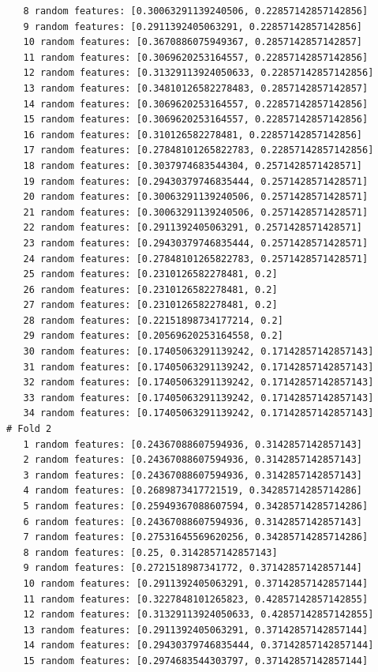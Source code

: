 \documentclass[12pt]{amsart}
\begin{document}
\begin{verbatim}
   8 random features: [0.30063291139240506, 0.22857142857142856]
   9 random features: [0.2911392405063291, 0.22857142857142856]
   10 random features: [0.3670886075949367, 0.2857142857142857]
   11 random features: [0.3069620253164557, 0.22857142857142856]
   12 random features: [0.31329113924050633, 0.22857142857142856]
   13 random features: [0.34810126582278483, 0.2857142857142857]
   14 random features: [0.3069620253164557, 0.22857142857142856]
   15 random features: [0.3069620253164557, 0.22857142857142856]
   16 random features: [0.310126582278481, 0.22857142857142856]
   17 random features: [0.27848101265822783, 0.22857142857142856]
   18 random features: [0.3037974683544304, 0.2571428571428571]
   19 random features: [0.29430379746835444, 0.2571428571428571]
   20 random features: [0.30063291139240506, 0.2571428571428571]
   21 random features: [0.30063291139240506, 0.2571428571428571]
   22 random features: [0.2911392405063291, 0.2571428571428571]
   23 random features: [0.29430379746835444, 0.2571428571428571]
   24 random features: [0.27848101265822783, 0.2571428571428571]
   25 random features: [0.2310126582278481, 0.2]
   26 random features: [0.2310126582278481, 0.2]
   27 random features: [0.2310126582278481, 0.2]
   28 random features: [0.22151898734177214, 0.2]
   29 random features: [0.20569620253164558, 0.2]
   30 random features: [0.17405063291139242, 0.17142857142857143]
   31 random features: [0.17405063291139242, 0.17142857142857143]
   32 random features: [0.17405063291139242, 0.17142857142857143]
   33 random features: [0.17405063291139242, 0.17142857142857143]
   34 random features: [0.17405063291139242, 0.17142857142857143]
# Fold 2
   1 random features: [0.24367088607594936, 0.3142857142857143]
   2 random features: [0.24367088607594936, 0.3142857142857143]
   3 random features: [0.24367088607594936, 0.3142857142857143]
   4 random features: [0.2689873417721519, 0.34285714285714286]
   5 random features: [0.25949367088607594, 0.34285714285714286]
   6 random features: [0.24367088607594936, 0.3142857142857143]
   7 random features: [0.27531645569620256, 0.34285714285714286]
   8 random features: [0.25, 0.3142857142857143]
   9 random features: [0.2721518987341772, 0.37142857142857144]
   10 random features: [0.2911392405063291, 0.37142857142857144]
   11 random features: [0.3227848101265823, 0.42857142857142855]
   12 random features: [0.31329113924050633, 0.42857142857142855]
   13 random features: [0.2911392405063291, 0.37142857142857144]
   14 random features: [0.29430379746835444, 0.37142857142857144]
   15 random features: [0.2974683544303797, 0.37142857142857144]

\end{verbatim}
\end{document}
